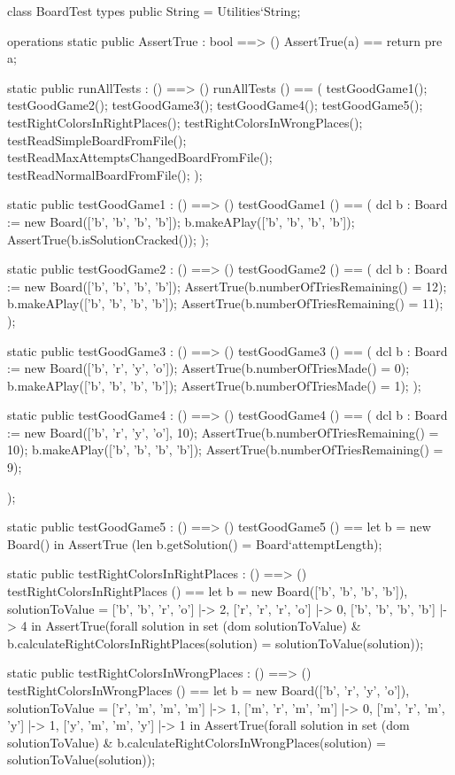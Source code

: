 \begin{vdm_al}
class BoardTest
 types
  public String = Utilities`String;

 operations
 static public AssertTrue : bool ==> ()
  AssertTrue(a) == return
    pre a;


 static public runAllTests : () ==> ()
  runAllTests () == (
   testGoodGame1();
   testGoodGame2();
   testGoodGame3();
   testGoodGame4();
   testGoodGame5();
   testRightColorsInRightPlaces();
   testRightColorsInWrongPlaces();
   testReadSimpleBoardFromFile();
   testReadMaxAttemptsChangedBoardFromFile();
   testReadNormalBoardFromFile();
  );


 static public testGoodGame1 : () ==> ()
 testGoodGame1 () ==
 ( dcl b : Board := new Board(['b', 'b', 'b', 'b']);
  b.makeAPlay(['b', 'b', 'b', 'b']);
  AssertTrue(b.isSolutionCracked());
 );


 static public testGoodGame2 : () ==> ()
 testGoodGame2 () ==
 ( dcl b : Board := new Board(['b', 'b', 'b', 'b']);
  AssertTrue(b.numberOfTriesRemaining() = 12);
  b.makeAPlay(['b', 'b', 'b', 'b']);
  AssertTrue(b.numberOfTriesRemaining() = 11);
 );


 static public testGoodGame3 : () ==> ()
 testGoodGame3 () ==
 ( dcl b : Board := new Board(['b', 'r', 'y', 'o']);
  AssertTrue(b.numberOfTriesMade() = 0);
  b.makeAPlay(['b', 'b', 'b', 'b']);
  AssertTrue(b.numberOfTriesMade() = 1);
 );


 static public testGoodGame4 : () ==> ()
 testGoodGame4 () ==
 ( dcl b : Board := new Board(['b', 'r', 'y', 'o'], 10);
  AssertTrue(b.numberOfTriesRemaining() = 10);
  b.makeAPlay(['b', 'b', 'b', 'b']);
  AssertTrue(b.numberOfTriesRemaining() = 9);

 );


 static public testGoodGame5 : () ==> ()
 testGoodGame5 () ==
  let b = new Board()
   in
   AssertTrue (len b.getSolution() = Board`attemptLength);


 static public testRightColorsInRightPlaces : () ==> ()
 testRightColorsInRightPlaces () ==
  let b = new Board(['b', 'b', 'b', 'b']),
   solutionToValue = {
    ['b', 'b', 'r', 'o'] |-> 2,
    ['r', 'r', 'r', 'o'] |-> 0,
    ['b', 'b', 'b', 'b'] |-> 4
   } in
   AssertTrue(forall solution in set (dom solutionToValue)
    & b.calculateRightColorsInRightPlaces(solution) = solutionToValue(solution));


 static public testRightColorsInWrongPlaces : () ==> ()
 testRightColorsInWrongPlaces () ==
  let b = new Board(['b', 'r', 'y', 'o']),
   solutionToValue = {
    ['r', 'm', 'm', 'm'] |-> 1,
    ['m', 'r', 'm', 'm'] |-> 0,
    ['m', 'r', 'm', 'y'] |-> 1,
    ['y', 'm', 'm', 'y'] |-> 1
   } in
   AssertTrue(forall solution in set (dom solutionToValue)
    & b.calculateRightColorsInWrongPlaces(solution) = solutionToValue(solution));



\end{vdm_al}
